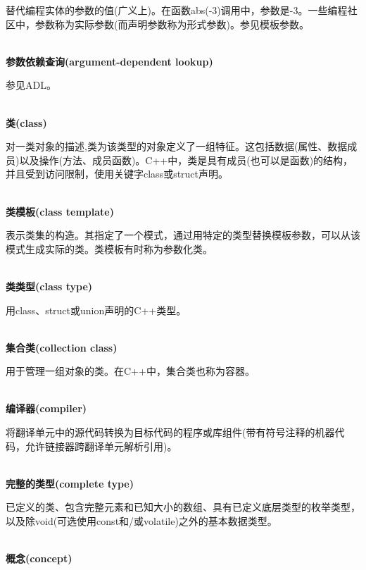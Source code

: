 替代编程实体的参数的值(广义上)。在函数abs(-3)调用中，参数是-3。一些编程社区中，参数称为实际参数(而声明参数称为形式参数)。参见模板参数。

\hspace*{\fill} \\ %
\noindent
\textbf{参数依赖查询(argument-dependent lookup)}

参见ADL。

\hspace*{\fill} \\ %
\noindent
\textbf{类(class)}
 
对一类对象的描述,类为该类型的对象定义了一组特征。这包括数据(属性、数据成员)以及操作(方法、成员函数)。C++中，类是具有成员(也可以是函数)的结构，并且受到访问限制，使用关键字class或struct声明。

\hspace*{\fill} \\ %
\noindent
\textbf{类模板(class template)}

表示类集的构造。其指定了一个模式，通过用特定的类型替换模板参数，可以从该模式生成实际的类。类模板有时称为参数化类。

\hspace*{\fill} \\ %
\noindent
\textbf{类类型(class type)}

用class、struct或union声明的C++类型。

\hspace*{\fill} \\ %
\noindent
\textbf{集合类(collection class)}

用于管理一组对象的类。在C++中，集合类也称为容器。

\hspace*{\fill} \\ %
\noindent
\textbf{编译器(compiler)}

将翻译单元中的源代码转换为目标代码的程序或库组件(带有符号注释的机器代码，允许链接器跨翻译单元解析引用)。

\hspace*{\fill} \\ %
\noindent
\textbf{完整的类型(complete type)}

已定义的类、包含完整元素和已知大小的数组、具有已定义底层类型的枚举类型，以及除void(可选使用const和/或volatile)之外的基本数据类型。

\hspace*{\fill} \\ %
\noindent
\textbf{概念(concept)}

